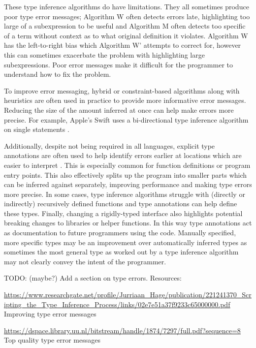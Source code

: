 \documentclass[a4paper,fleqn,12pt]{article}
\begin{document}
These type inference algorithms do have limitations. They all sometimes produce poor type error messages; Algorithm W often detects errors late, highlighting too large of a subexpression to be useful and Algorithm M often detects too specific of a term without context as to what original definition it violates. Algorithm W has the left-to-right bias which Algorithm W’ attempts to correct for, however this can sometimes exacerbate the problem with highlighting large subexpressions. Poor error messages make it difficult for the programmer to understand how to fix the problem.

To improve error messaging, hybrid or constraint-based algorithms along with heuristics are often used in practice to provide more informative error messages. Reducing the size of the amount inferred at once can help make errors more precise. For example, Apple’s Swift uses a bi-directional type inference algorithm on single statements \citep{ref34}.

Additionally, despite not being required in all languages, explicit type annotations are often used to help identify errors earlier at locations which are easier to interpret \citep{ref35}. This is especially common for function definitions or program entry points. This also effectively splits up the program into smaller parts which can be inferred against separately, improving performance and making type errors more precise. In some cases, type inference algorithms struggle with (directly or indirectly) recursively defined functions and type annotations can help define these types. Finally, changing a rigidly-typed interface also highlights potential breaking changes to libraries or helper functions. In this way type annotations act as documentation to future programmers using the code. Manually specified, more specific types may be an improvement over automatically inferred types as sometimes the most general type as worked out by a type inference algorithm may not clearly convey the intent of the programmer.

TODO: (maybe?) Add a section on type errors. Resources:

\underline{\href{https://www.researchgate.net/profile/Jurriaan\_Hage/publication/221241370\_Scripting\_the\_Type\_Inference\_Process/links/02e7e51a37f9233c65000000.pdf}{https://www.researchgate.net/profile/Jurriaan\_Hage/publication/221241370\_Scripting\_the\_Type\_Inference\_Process/links/02e7e51a37f9233c65000000.pdf}}
Improving type error messages

\underline{\href{https://dspace.library.uu.nl/bitstream/handle/1874/7297/full.pdf?sequence=8}{https://dspace.library.uu.nl/bitstream/handle/1874/7297/full.pdf?sequence=8}}
Top quality type error messages
\end{document}
